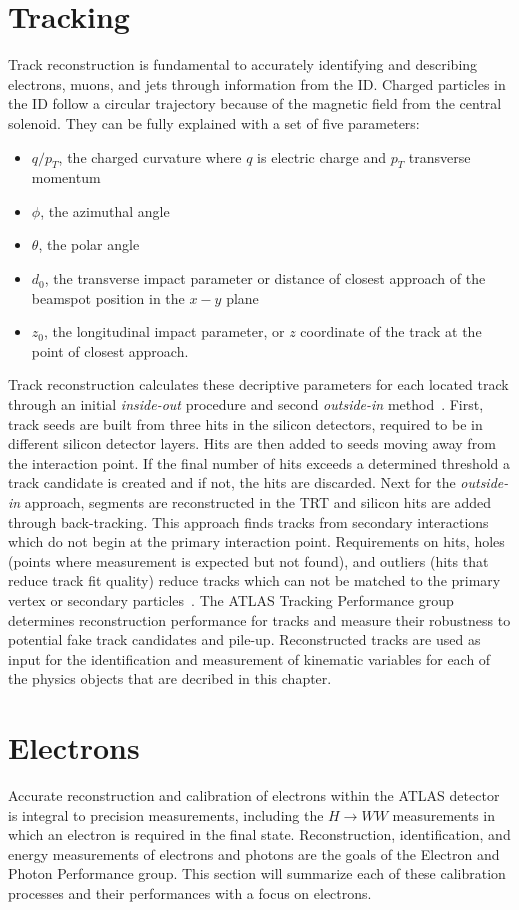 \section{Tracking}
Track reconstruction is fundamental to accurately identifying and describing electrons, muons, and jets through information from the ID. Charged particles in the ID follow a circular trajectory because of the magnetic field from the central solenoid. They can be fully explained with a set of five parameters:
\begin{itemize}
\item $q/p_T$, the charged curvature where $q$ is electric charge and $p_T$ transverse momentum
\item $\phi$, the azimuthal angle
\item $\theta$, the polar angle
\item $d_0$, the transverse impact parameter or distance of closest approach of the beamspot position in the $x-y$ plane
\item $z_0$, the longitudinal impact parameter, or $z$ coordinate of the track at the point of closest approach. 
\end{itemize}
Track reconstruction calculates these decriptive parameters for each located track through an initial \textit{inside-out} procedure and second \textit{outside-in} method~\cite{tracking}. First, track seeds are built from three hits in the silicon detectors, required to be in different silicon detector layers. Hits are then added to seeds moving away from the interaction point. If the final number of hits exceeds a determined threshold a track candidate is created and if not, the hits are discarded. Next for the \textit{outside-in} approach, segments are reconstructed in the TRT and silicon hits are added  through back-tracking. This approach finds tracks from secondary interactions which do not begin at the primary interaction point. Requirements on hits, holes (points where measurement is expected but not found), and outliers (hits that reduce track fit quality) reduce tracks which can not be matched to the primary vertex or secondary particles~\cite{IDreconstruction}. The ATLAS Tracking Performance group determines reconstruction performance for tracks and measure their robustness to potential fake track candidates and pile-up. Reconstructed tracks are used as input for the identification and measurement of kinematic variables for each of the physics objects that are decribed in this chapter. 

\section{Electrons}
Accurate reconstruction and calibration of electrons within the ATLAS detector is integral to precision measurements, including the $H\rightarrow WW$ measurements in which an electron is required in the final state. Reconstruction, identification, and energy measurements of electrons and photons are the goals of the Electron and Photon Performance group.  This section will summarize each of these calibration processes and their performances with a focus on electrons. 

